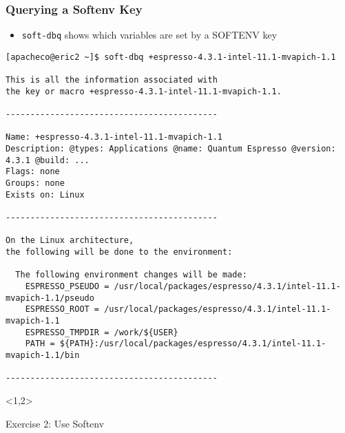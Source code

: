 \documentclass[slidestop,mathserif,compress,xcolor=svgnames,table]{beamer}
\newenvironment{eblock}[0]
{
\begin{beamerboxesrounded}[upper=uppercol2,lower=lowercol2,shadow=true]}
{\end{beamerboxesrounded}}
\begin{document}
\begin{frame}[fragile]
\frametitle{\small Querying a Softenv Key}
\begin{itemize}
\item \texttt{soft-dbq} shows which variables are set by a SOFTENV key
\end{itemize}
{\tiny
\begin{alertblock}{}
\begin{verbatim}
[apacheco@eric2 ~]$ soft-dbq +espresso-4.3.1-intel-11.1-mvapich-1.1

This is all the information associated with
the key or macro +espresso-4.3.1-intel-11.1-mvapich-1.1.

-------------------------------------------

Name: +espresso-4.3.1-intel-11.1-mvapich-1.1
Description: @types: Applications @name: Quantum Espresso @version: 4.3.1 @build: ...
Flags: none
Groups: none
Exists on: Linux 

-------------------------------------------

On the Linux architecture,
the following will be done to the environment:

  The following environment changes will be made:
    ESPRESSO_PSEUDO = /usr/local/packages/espresso/4.3.1/intel-11.1-mvapich-1.1/pseudo
    ESPRESSO_ROOT = /usr/local/packages/espresso/4.3.1/intel-11.1-mvapich-1.1
    ESPRESSO_TMPDIR = /work/${USER}
    PATH = ${PATH}:/usr/local/packages/espresso/4.3.1/intel-11.1-mvapich-1.1/bin

-------------------------------------------

\end{verbatim}
\end{alertblock}
}
\end{frame}

\begin{frame}<1,2>
\begin{eblock}{Exercise 2: Use Softenv}
 \begin{itemize}
 \end{itemize}

\end{eblock}

\end{frame}
\end{document}

